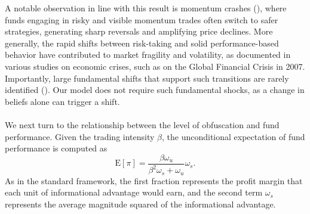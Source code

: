 A notable observation in line with this result is momentum crashes (\citealp{daniel2016momentum}), where funds engaging in risky and visible momentum trades often switch to safer strategies, generating sharp reversals and amplifying price declines. More generally, the rapid shifts between risk-taking and solid performance-based behavior have contributed to market fragility and volatility, as documented in various studies on economic crises, such as \citet{brunnermeier2009deciphering} on the Global Financial Crisis in 2007. Importantly, large fundamental shifts that support such transitions are rarely identified (\citealp{gennotte1999market}). Our model does not require such fundamental shocks, as a change in beliefs alone can trigger a shift.

\paragraph{}
We next turn to the relationship between the level of obfuscation and fund performance. Given the trading intensity $\beta$, the unconditional expectation of fund performance is computed as
\begin{equation}
     \mathrm{E}[\pi] = \frac{\beta \omega_{u}}{\beta^2 \omega_{s} + \omega_{u}}\omega_{s}.\label{eq:unconditional pi}
\end{equation}
As in the standard \citet{kyle1985continuous} framework, the first fraction represents the profit margin that each unit of informational advantage would earn, and the second term $\omega_s$ represents the average magnitude squared of the informational advantage.

